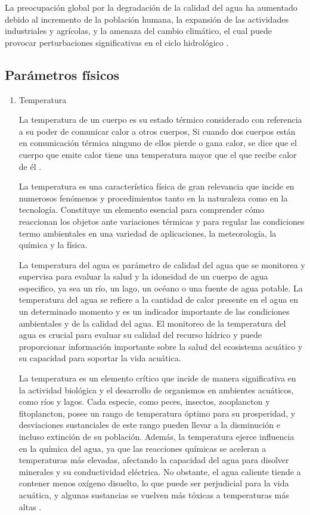 La preocupación global por la degradación de la calidad del agua ha aumentado debido al incremento de la población humana, la expansión de las actividades industriales y agrícolas, y la amenaza del cambio climático, el cual puede provocar perturbaciones significativas en el ciclo hidrológico \cite{bibliot}.

\subsection{Parámetros físicos }
\begin{enumerate}[label=\alph*)]
    \item Temperatura
    
    La temperatura de un cuerpo es su estado térmico considerado con referencia a su poder de comunicar calor a otros cuerpos, Si cuando dos cuerpos están en comunicación térmica ninguno de ellos pierde o gana calor, se dice que el cuerpo que emite calor tiene una temperatura mayor que el que recibe calor de él \cite{Maxwell1902}.
    
La temperatura es una característica física de gran relevancia que incide en numerosos fenómenos y procedimientos tanto en la naturaleza como en la tecnología. Constituye un elemento esencial para comprender cómo reaccionan los objetos ante variaciones térmicas y para regular las condiciones termo ambientales en una variedad de aplicaciones, la meteorología, la química y la física.

La temperatura del agua es parámetro de calidad del agua que se monitorea y supervisa para evaluar la salud y la idoneidad de un cuerpo de agua especifico, ya sea un río, un lago, un océano o una fuente de agua potable. La temperatura del agua se refiere a la cantidad de calor presente en el agua en un determinado momento y es un indicador importante de las condiciones ambientales y de la calidad del agua. El monitoreo de la temperatura del agua es crucial para evaluar su calidad del recurso hídrico y puede proporcionar información importante sobre la salud del ecosistema acuático y su capacidad para soportar la vida acuática.

La temperatura es un elemento crítico que incide de manera significativa en la actividad biológica y el desarrollo de organismos en ambientes acuáticos, como ríos y lagos. Cada especie, como peces, insectos, zooplancton y fitoplancton, posee un rango de temperatura óptimo para su prosperidad, y desviaciones sustanciales de este rango pueden llevar a la disminución e incluso extinción de su población. Además, la temperatura ejerce influencia en la química del agua, ya que las reacciones químicas se aceleran a temperaturas más elevadas, afectando la capacidad del agua para disolver minerales y su conductividad eléctrica. No obstante, el agua caliente tiende a contener menos oxígeno disuelto, lo que puede ser perjudicial para la vida acuática, y algunas sustancias se vuelven más tóxicas a temperaturas más altas \cite{sience}.

    
\end{enumerate}
